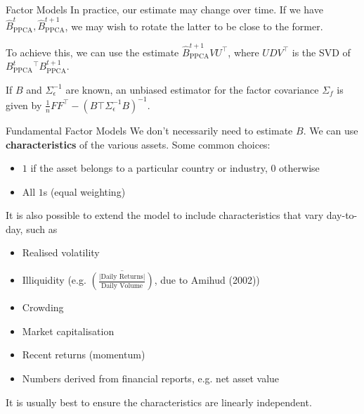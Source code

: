 \documentclass{beamer}
\begin{document}
\begin{frame}{Factor Models}
	In practice, our estimate may change over time. If we have $\hat{B}_\textrm{PPCA}^t,\hat{B}_\textrm{PPCA}^{t+1}$, we may wish to rotate the latter to be close to the former.

	To achieve this, we can use the estimate $\hat{B}_\textrm{PPCA}^{t+1}VU^\top$, where $UDV^\top$ is the SVD of $B_\textrm{PPCA}^t^\top B_\textrm{PPCA}^{t+1}$.%

	If $B$ and $\Sigma_\epsilon^{-1}$ are known, an unbiased estimator for the factor covariance $\Sigma_f$ is given by $\frac{1}{n}F F^\top - (B\top \Sigma_\epsilon^{-1} B)^{-1}$.%
\end{frame}

\begin{frame}{Fundamental Factor Models}
	We don't necessarily need to estimate $B$. We can use \textbf{characteristics} of the various assets. Some common choices:
	\begin{itemize}
		\item $1$ if the asset belongs to a particular country or industry, $0$ otherwise
		\item All $1$s (equal weighting)
	\end{itemize}

	It is also possible to extend the model to include characteristics that vary day-to-day, such as
	\begin{itemize}
		\item Realised volatility
		\item Illiquidity (e.g. $\overline{\left(\frac{\vert \textrm{Daily Returns}\vert}{\textrm{Daily Volume}}\right)}$, due to Amihud (2002))
		\item Crowding
		\item Market capitalisation
		\item Recent returns (momentum)%
		\item Numbers derived from financial reports, e.g. net asset value
	\end{itemize}

	It is usually best to ensure the characteristics are linearly independent.
\end{frame}
\end{document}
